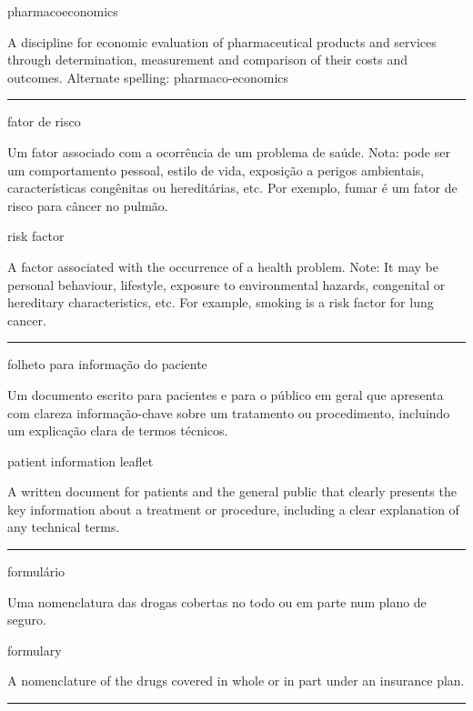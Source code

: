 \documentclass[
]{book}
\begin{document}
pharmacoeconomics

A discipline for economic evaluation of pharmaceutical products and services through determination, measurement and comparison of their costs and outcomes. Alternate spelling: pharmaco-economics

\begin{center}\rule{0.5\linewidth}{0.5pt}\end{center}

fator de risco

Um fator associado com a ocorrência de um problema de saúde. Nota: pode ser um comportamento pessoal, estilo de vida, exposição a perigos ambientais, características congênitas ou hereditárias, etc. Por exemplo, fumar é um fator de risco para câncer no pulmão.

risk factor

A factor associated with the occurrence of a health problem. Note: It may be personal behaviour, lifestyle, exposure to environmental hazards, congenital or hereditary characteristics, etc. For example, smoking is a risk factor for lung cancer.

\begin{center}\rule{0.5\linewidth}{0.5pt}\end{center}

folheto para informação do paciente

Um documento escrito para pacientes e para o público em geral que apresenta com clareza informação-chave sobre um tratamento ou procedimento, incluindo um explicação clara de termos técnicos.

patient information leaflet

A written document for patients and the general public that clearly presents the key information about a treatment or procedure, including a clear explanation of any technical terms.

\begin{center}\rule{0.5\linewidth}{0.5pt}\end{center}

formulário

Uma nomenclatura das drogas cobertas no todo ou em parte num plano de seguro.

formulary

A nomenclature of the drugs covered in whole or in part under an insurance plan.

\begin{center}\rule{0.5\linewidth}{0.5pt}\end{center}
\end{document}
